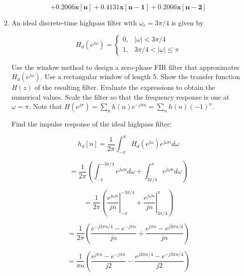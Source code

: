 \documentclass[fleqn]{article}
\begin{document}
\begin{enumerate}[nolistsep]
		\begin{equation*}
			\mathbf{+ 0.2066x[n] + 0.4131x[n-1] + 0.2066x[n-2]}
		\end{equation*}
		
		\item An ideal discrete-time highpass filter with $\omega_c = 3\pi/4$ is given by
		
		\begin{equation*}
			H_d(e^{j\omega}) = 
			\begin{cases}
				0, & |\omega| < 3\pi/4 \\
				1, & 3\pi/4 < |\omega| \leq \pi
			\end{cases}
		\end{equation*}
		
		Use the window method to design a zero-phase FIR filter that approximates $H_d(e^{j\omega})$. Use a rectangular window of length 5. Show the transfer function $H(z)$ of the resulting filter. Evaluate the expressions to obtain the numerical values. Scale the filter so that the frequency response is one at $\omega = \pi$. Note that $H(e^{j\pi}) = \sum_{n}{h(n)e^{-j{\pi}n}} = \sum_{n}{h(n)(-1)^n}$.
		
		Find the impulse response of the ideal highpass filter:
		
		\begin{equation*}
			h_d[n] = \frac{1}{2\pi}\int_{-\pi}^{\pi}{H_d(e^{j\omega})e^{j{\omega}n}}d\omega
		\end{equation*}
		
		\begin{equation*}
			= \frac{1}{2\pi}\left(\int_{-\pi}^{-3\pi/4}{e^{j{\omega}n}d\omega} + \int_{3\pi/4}^{\pi}{e^{j{\omega}n}d\omega}\right)
		\end{equation*}
		
		\begin{equation*}
			= \frac{1}{2\pi}\left(\left.\frac{e^{j{\omega}n}}{jn}\right\vert_{-\pi}^{-3\pi/4} + \left.\frac{e^{j{\omega}n}}{jn}\right\vert_{3\pi/4}^{\pi}\right)
		\end{equation*}
		
		\begin{equation*}
			= \frac{1}{2\pi}\left(\frac{e^{-j3{\pi}n/4} - e^{-j{\pi}n}}{jn} + \frac{e^{j{\pi}n} - e^{j3{\pi}n/4}}{jn}\right)
		\end{equation*}
		
		\begin{equation*}
			= \frac{1}{{\pi}n}\left(\frac{e^{j{\pi}n} - e^{-j{\pi}n}}{j2} - \frac{e^{j3{\pi}n/4} - e^{-j3{\pi}n/4}}{j2}\right)
		\end{equation*}
		

\end{enumerate}
\end{document}
